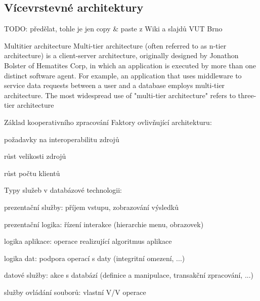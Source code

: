 \subsection{Vícevrstevné architektury}

TODO: předělat, tohle je jen copy \& paste z Wiki a slajdů VUT Brno


\begin{obecne}{Multitier architecture}
Multi-tier architecture (often referred to as n-tier architecture) is a client-server architecture, originally designed by Jonathon Bolster of Hematites Corp, in which an application is executed by more than one distinct software agent. For example, an application that uses middleware to service data requests between a user and a database employs multi-tier architecture. The most widespread use of "multi-tier architecture" refers to three-tier architecture
\end{obecne}


\begin{obecne}{Základ kooperativního zpracování}
Faktory ovlivňující architekturu:
\begin{pitemize}
\item požadavky na interoperabilitu zdrojů 
\item růst velikosti zdrojů 
\item růst počtu klientů 
\end{pitemize}
Typy služeb v databázové technologii:
\begin{pitemize}
\item prezentační služby: příjem vstupu, zobrazování výsledků 
\item prezentační logika: řízení interakce (hierarchie menu, obrazovek)
\item logika aplikace: operace realizující algoritmus aplikace
\item logika dat: podpora operací s daty (integritní omezení, ...)
\item datové služby: akce s databází (definice a manipulace, transakční zpracování, ...) 
\item služby ovládání souborů: vlastní V/V operace
\end{pitemize}
\end{obecne}


